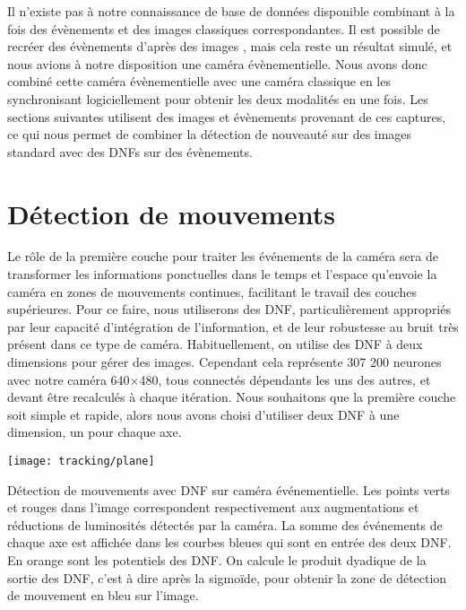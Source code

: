 	Il n'existe pas à notre connaissance de base de données disponible combinant à la fois des évènements et des images classiques correspondantes. Il est possible de recréer des évènements d'après des images \cite{hu2021v2e}, mais cela reste un résultat simulé, et nous avions à notre disposition une caméra évènementielle. Nous avons donc combiné cette caméra évènementielle avec une caméra classique en les synchronisant logiciellement pour obtenir les deux modalités en une fois. Les sections suivantes utilisent des images et évènements provenant de ces captures, ce qui nous permet de combiner la détection de nouveauté sur des images standard avec des DNFs sur des évènements.

	\newpage

	\section{Détection de mouvements}

	Le rôle de la première couche pour traiter les événements de la caméra sera de transformer les informations ponctuelles dans le temps et l'espace qu'envoie la caméra en zones de mouvements continues, facilitant le travail des couches supérieures. Pour ce faire, nous utiliserons des DNF, particulièrement appropriés par leur capacité d'intégration de l'information, et de leur robustesse au bruit très présent dans ce type de caméra. Habituellement, on utilise des DNF à deux dimensions pour gérer des images. Cependant cela représente 307 200 neurones avec notre caméra 640$\times$480, tous connectés dépendants les uns des autres, et devant être recalculés à chaque itération. Nous souhaitons que la première couche soit simple et rapide, alors nous avons choisi d'utiliser deux DNF à une dimension, un pour chaque axe.

	\begin{figureth}
		\begin{subfigureth}{\textwidth}
			\texttt{[image: tracking/plane]}
		\end{subfigureth}
		\caption[Détection de mouvements avec DNF sur caméra événementielle]{Détection de mouvements avec DNF sur caméra événementielle. Les points verts et rouges dans l'image correspondent respectivement aux augmentations et réductions de luminosités détectés par la caméra. La somme des événements de chaque axe est affichée dans les courbes bleues qui sont en entrée des deux DNF. En orange sont les potentiels des DNF. On calcule le produit dyadique de la sortie des DNF, c'est à dire après la sigmoïde, pour obtenir la zone de détection de mouvement en bleu sur l'image.}\label{fig:track:plane}
	\end{figureth}

